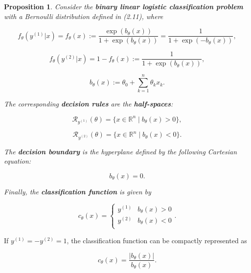 \documentclass{report}
\newtheorem{proposition}{Proposition}[chapter]
\begin{document}
\begin{proposition}
Consider the \textbf{binary linear logistic classification problem} with a Bernoulli distribution defined in (2.11), where

\begin{equation}
f_\theta(y^{(1)}|x) = f_\theta(x) := \frac{\exp(b_\theta(x))}{1+\exp(b_\theta(x))} = \frac{1}{1+\exp(-b_\theta(x))},
\end{equation}

\begin{equation}
f_\theta(y^{(2)}|x) = 1- f_\theta(x) := \frac{1}{1+\exp(b_\theta(x))},
\end{equation}

\begin{equation}
b_\theta(x) := \theta_0 + \sum_{k=1}^{n}\theta_kx_k.
\end{equation}

The corresponding \textbf{decision rules} are the \textbf{half-spaces}:

\begin{equation}
\mathcal{R}_{y^{(1)}}(\theta) = \{x \in \mathbb{R}^n \mid b_\theta(x) > 0 \},
\end{equation}

\begin{equation}
\mathcal{R}_{y^{(2)}}(\theta) = \{x \in \mathbb{R}^n \mid b_\theta(x) < 0 \}.
\end{equation}

The \textbf{decision boundary} is the hyperplane defined by the following Cartesian equation:

\begin{equation}
b_\theta(x) = 0.
\end{equation}

Finally, the \textbf{classification function} is given by

\begin{equation}
c_\theta(x) = \left\{\begin{matrix}
y^{(1)} & b_\theta(x) > 0\\
y^{(2)} & b_\theta(x) < 0\\
\end{matrix}\right..
\end{equation}
\end{proposition}

If $y^{(1)} = -y^{(2)} = 1$, the classification function can be compactly represented as

\begin{equation}
c_\theta(x) = \frac{|b_\theta(x)|}{b_\theta(x)}.
\end{equation}
\end{document}
